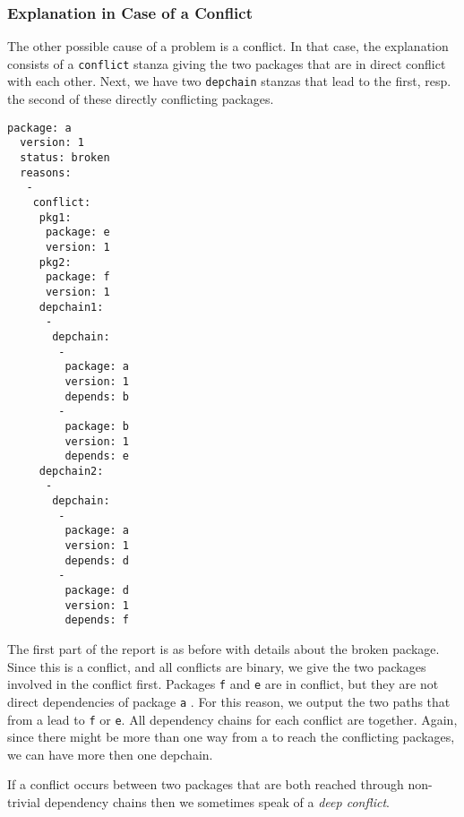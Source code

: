 \subsubsection{Explanation in Case of a Conflict}
The other possible cause of a problem is a conflict. In that case, the
explanation consists of a \texttt{conflict} stanza giving the two
packages that are in direct conflict with each other. Next, we have
two \texttt{depchain} stanzas that lead to the first, resp. the second
of these directly conflicting packages.
\begin{example}
\begin{verbatim}
package: a
  version: 1
  status: broken
  reasons:
   -
    conflict:
     pkg1:
      package: e
      version: 1
     pkg2:
      package: f
      version: 1
     depchain1:
      -
       depchain:
        -
         package: a
         version: 1
         depends: b
        -
         package: b
         version: 1
         depends: e
     depchain2:
      -
       depchain:
        -
         package: a
         version: 1
         depends: d
        -
         package: d
         version: 1
         depends: f
\end{verbatim}
The first part of the \debcheck{} report is as before with details
about the broken package. Since this is a conflict, and all conflicts
are binary, we give the two packages involved in the conflict
first. Packages \texttt{f} and \texttt{e} are in conflict, but they
are not direct dependencies of package \texttt{a} . For this reason,
we output the two paths that from a lead to \texttt{f} or
\texttt{e}. All dependency chains for each conflict are
together. Again, since there might be more than one way from a to
reach the conflicting packages, we can have more then one depchain.
\end{example}
If a conflict occurs between two packages that are both reached
through non-trivial dependency chains then we sometimes speak of a
\emph{deep conflict}.



